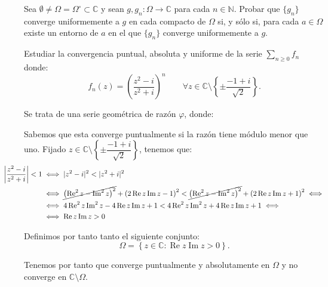 \documentclass[12pt]{article}
\renewcommand{\Re}{\operatorname{Re}} %
\renewcommand{\Im}{\operatorname{Im}}
\begin{document}
    \begin{ejercicio}
        Sea $\emptyset\neq \Omega=\Omega^\circ \subset \mathbb{C}$ y sean $g, g_n : \Omega \to \mathbb{C}$ para cada $n \in \mathbb{N}$. Probar que $\{g_n\}$ converge uniformemente a $g$ en cada compacto de $\Omega$ si, y sólo si, para cada $a \in \Omega$ existe un entorno de $a$ en el que $\{g_n\}$ converge uniformemente a $g$.
    \end{ejercicio}


    \newpage
    \setcounter{ejercicio}{0}

    \begin{ejercicio}[3 puntos]
        Estudiar la convergencia puntual, absoluta y uniforme de la serie $\sum\limits_{n \geq 0} f_n$ donde:
        \[
            f_n(z) = \left(\dfrac{z^2-i}{z^2+i}\right)^n\qquad \forall z \in \mathbb{C} \setminus \left\{\pm \dfrac{-1+i}{\sqrt{2}}\right\}.
        \]

        Se trata de una serie geométrica de razón $\varphi$, donde:
        
        Sabemos que esta converge puntualmente si la razón tiene módulo menor que uno. Fijado $z \in \mathbb{C} \setminus \left\{\pm \dfrac{-1+i}{\sqrt{2}}\right\}$, tenemos que:
        \begin{align*}
            \hspace{-1cm}\left|\dfrac{z^2-i}{z^2+i}\right| < 1 &\iff |z^2-i|^2 < |z^2+i|^2 \\
            \hspace{-1cm}&\iff \cancel{\left(\Re^2 z - \Im^ 2 z\right)^2} + \left(2 \Re z \Im z - 1\right)^2 < \cancel{\left(\Re^2 z - \Im^ 2 z\right)^2} + \left(2 \Re z \Im z + 1\right)^2 \iff\\
            \hspace{-1cm}&\iff 4\Re^2 z \Im^2 z - 4\Re z \Im z +1 < 4\Re^2 z \Im^2 z + 4\Re z \Im z +1 \iff\\
            &\iff \Re z\Im z > 0
        \end{align*}

        Definimos por tanto tanto el siguiente conjunto:
        \begin{equation*}
            \Omega = \left\{z \in \mathbb{C} : \Re z \Im z > 0\right\}.
        \end{equation*}

        Tenemos por tanto que converge puntualmente y absolutamente en $\Omega$ y no converge en $\mathbb{C} \setminus \Omega$.\\


\end{ejercicio}
\end{document}
